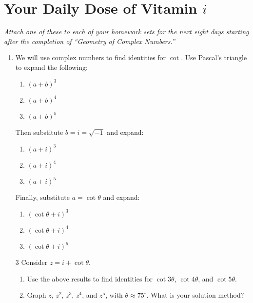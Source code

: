 \documentclass[../gatm.tex]{subfiles}
\begin{document}
\section{Your Daily Dose of Vitamin $i$}

\newcommand{\Arg} {\operatorname{Arg}}
\newcommand{\cis} {\operatorname{cis}}
\newcommand{\Real} {\operatorname{Re}}
\newcommand{\Imag} {\operatorname{Im}}

\textit{Attach one of these to each of your homework sets for the next eight days starting after the completion of ``Geometry of Complex Numbers.''}


\begin{enumerate}
\item We will use complex numbers to find identities for $\cot$. Use Pascal's triangle to expand the following:
\begin{multicols}{3}
\begin{enumerate}
\item $(a+b)^3$
\item $(a+b)^4$
\item $(a+b)^5$
\setcounter{vit_i_problem_ii}{\value{enumii}}
\end{enumerate}
\end{multicols}
Then substitute $b=i=\sqrt{-1}$ and expand:
\begin{multicols}{3}
\begin{enumerate}
\setcounter{enumii}{\value{vit_i_problem_ii}}
\item $(a+i)^3$
\item $(a+i)^4$
\item $(a+i)^5$
\setcounter{vit_i_problem_ii}{\value{enumii}}
\end{enumerate}
\end{multicols}
Finally, substitute $a=\cot \theta$ and expand:
\begin{multicols}{3}
\begin{enumerate}
\setcounter{enumii}{\value{vit_i_problem_ii}}
\item $(\cot \theta +i)^3$
\item $(\cot \theta +i)^4$
\item $(\cot \theta +i)^5$
\setcounter{vit_i_problem_ii}{\value{enumii}}
\end{enumerate}
\end{multicols}{3}
Consider $z=i+\cot\theta$.
\begin{enumerate}
\setcounter{enumii}{\value{vit_i_problem_ii}}
\item Use the above results to find identities for $\cot 3\theta$, $\cot 4\theta$, and $\cot 5\theta$.
\item Graph $z$, $z^2$, $z^3$, $z^4$, and $z^5$, with $\theta \approx 75^\circ$. What is your solution method?
\end{enumerate}


\end{enumerate}
\end{document}
